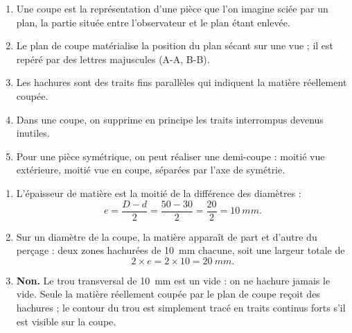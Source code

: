 \documentclass[11pt]{article}
\newcommand{\cle}[1]{{\popxbold\color{popdark}#1}}
\begin{document}
\begin{corrige}
\begin{enumerate}
\item Une \cle{coupe} est la représentation d'une pièce que l'on imagine sciée par un plan, la partie située entre l'observateur et le plan étant enlevée.
\item Le \cle{plan de coupe} matérialise la position du plan sécant sur une vue ; il est repéré par des lettres majuscules (A-A, B-B).
\item Les \cle{hachures} sont des traits fins parallèles qui indiquent la matière réellement coupée.
\item Dans une coupe, on supprime en principe les \cle{traits interrompus} devenus inutiles.
\item Pour une pièce symétrique, on peut réaliser une \cle{demi-coupe} : moitié vue extérieure, moitié vue en coupe, séparées par l'axe de symétrie.
\end{enumerate}
\end{corrige}

\begin{corrige}
\begin{enumerate}
\item L'épaisseur de matière est la moitié de la différence des diamètres :
\[ e = \frac{D - d}{2} = \frac{50 - 30}{2} = \frac{20}{2} = \SI{10}{mm}. \]
\item Sur un diamètre de la coupe, la matière apparaît de part et d'autre du perçage : deux zones hachurées de \SI{10}{mm} chacune, soit une largeur totale de
\[ 2 \times e = 2 \times 10 = \SI{20}{mm}. \]
\item \textbf{Non.} Le trou transversal de \SI{10}{mm} est un vide : on ne hachure jamais le vide. Seule la matière réellement coupée par le plan de coupe reçoit des hachures ; le contour du trou est simplement tracé en traits continus forts s'il est visible sur la coupe.
\end{enumerate}
\end{corrige}
\end{document}
